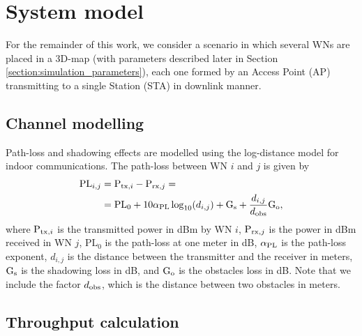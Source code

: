 \documentclass{article}
\begin{document}
	\section{System model}
	\label{section:system_model}	
	
	For the remainder of this work, we consider a scenario in which several WNs are placed in a 3D-map (with parameters described later in Section \ref{section:simulation_parameters}), each one formed by an Access Point (AP) transmitting to a single Station (STA) in downlink manner. 
	
	\subsection{Channel modelling}
	\label{section:channel_modelling}	
	
	Path-loss and shadowing effects are modelled using the log-distance model for indoor communications. The path-loss between WN $i$ and $j$ is given by	
	\begin{align}
	\text{PL}_{i,j} &= \text{P}_{{\rm tx},i} - \text{P}_{{\rm rx},j} = \nonumber \\ & = \text{PL}_0 + 10  \alpha_{\rm PL}  \log_{10}(d_{i,j}) + \text{G}_{{\rm s}} + \frac{d_{i,j}}{d_{{\rm obs}}} \text{G}_{{\rm o}}, \nonumber
	\end{align}
	where $\text{P}_{{\rm tx},i}$ is the transmitted power in dBm by WN $i$, $\text{P}_{{\rm rx},j}$ is the power in dBm received in WN $j$, $\text{PL}_0$ is the path-loss at one meter in dB, $\alpha_{\rm PL}$ is the path-loss exponent, $d_{i,j}$ is the distance between the transmitter and the receiver in meters, $\text{G}_{{\rm s}}$ is the shadowing loss in dB, and $\text{G}_{{\rm o}}$ is the obstacles loss in dB. Note that we include the factor $d_{{\rm obs}}$, which is the distance between two obstacles in meters. 
	
	\subsection{Throughput calculation}
	\label{section:throughput_calculation}
	
\end{document}

